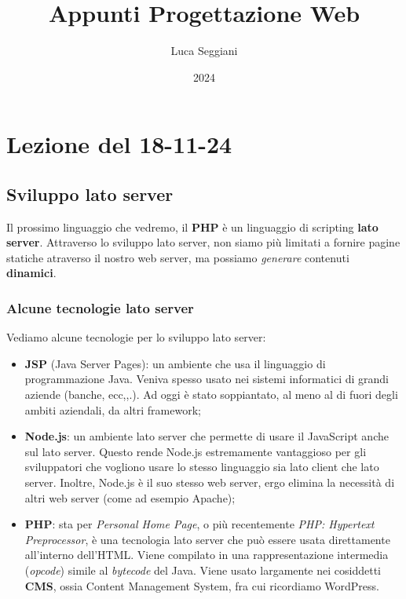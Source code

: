 \documentclass[a4paper,11pt]{article}
\title{Appunti Progettazione Web}
\author{Luca Seggiani}
\date{2024}
\begin{document}
\section{Lezione del 18-11-24}

\thispagestyle{empty}
\pagestyle{fancy}

\lstset{language=php, style=codestyle}

\subsection{Sviluppo lato server}
Il prossimo linguaggio che vedremo, il \textbf{PHP} è un linguaggio di scripting \textbf{lato server}.
Attraverso lo sviluppo lato server, non siamo più limitati a fornire pagine statiche atraverso il nostro web server, ma possiamo \textit{generare} contenuti \textbf{dinamici}.

\subsubsection{Alcune tecnologie lato server}
Vediamo alcune tecnologie per lo sviluppo lato server:
\begin{itemize}
	\item \textbf{JSP} (Java Server Pages): un ambiente che usa il linguaggio di programmazione Java.
		Veniva spesso usato nei sistemi informatici di grandi aziende (banche, ecc,,.). 
		Ad oggi è stato soppiantato, al meno al di fuori degli ambiti aziendali, da altri framework;
	\item \textbf{Node.js}: un ambiente lato server che permette di usare il JavaScript anche sul lato server. 
		Questo rende Node.js estremamente vantaggioso per gli sviluppatori che vogliono usare lo stesso linguaggio sia lato client che lato server.
		Inoltre, Node.js è il suo stesso web server, ergo elimina la necessità di altri web server (come ad esempio Apache);
	\item \textbf{PHP}: sta per \textit{Personal Home Page}, o più recentemente \textit{PHP: Hypertext Preprocessor}, è una tecnologia lato server che può essere usata direttamente all'interno dell'HTML. 
		Viene compilato in una rappresentazione intermedia (\textit{opcode}) simile al \textit{bytecode} del Java.
		Viene usato largamente nei cosiddetti \textbf{CMS}, ossia Content Management System, fra cui ricordiamo WordPress. 
\end{itemize}
\end{document}
